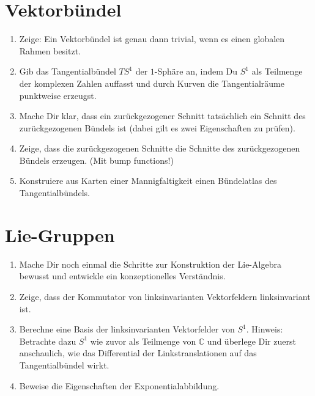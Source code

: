 \documentclass[a4paper]{scrartcl}
\begin{document}
	\section{Vektorbündel}
	\begin{enumerate}
		\item Zeige: Ein Vektorbündel ist genau dann trivial, wenn es einen globalen Rahmen besitzt.
		\item Gib das Tangentialbündel $TS^1$ der $1$-Sphäre an, indem Du $S^1$ als Teilmenge der komplexen Zahlen auffasst und durch Kurven die Tangentialräume punktweise erzeugst.
		\item Mache Dir klar, dass ein zurückgezogener Schnitt tatsächlich ein Schnitt des zurückgezogenen Bündels ist (dabei gilt es zwei Eigenschaften zu prüfen).
		\item Zeige, dass die zurückgezogenen Schnitte die Schnitte des zurückgezogenen Bündels erzeugen. (Mit bump functions!)
		\item Konstruiere aus Karten einer Mannigfaltigkeit einen Bündelatlas des Tangentialbündels.
	\end{enumerate}
	\section{Lie-Gruppen}
	\begin{enumerate}
		\item Mache Dir noch einmal die Schritte zur Konstruktion der Lie-Algebra bewusst und entwickle ein konzeptionelles Verständnis.
		\item Zeige, dass der Kommutator von linksinvarianten Vektorfeldern linksinvariant ist.
		\item Berechne eine Basis der linksinvarianten Vektorfelder von $S^1$. Hinweis: Betrachte dazu $S^1$ wie zuvor als Teilmenge von $\mathbb{C}$ und überlege Dir zuerst anschaulich, wie das Differential der Linkstranslationen auf das Tangentialbündel wirkt.
		\item Beweise die Eigenschaften der Exponentialabbildung.
	\end{enumerate}
\end{document}
